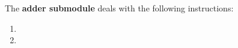 The \textbf{adder submodule} deals with the following instructions:
\begin{multicols}{2}
\begin{enumerate}
	\item {}
	\item {}
\end{enumerate}
\end{multicols}
